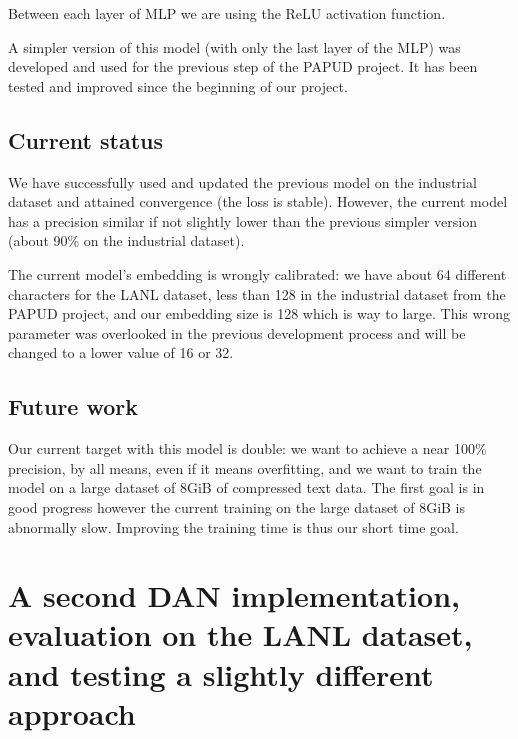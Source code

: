 Between each layer of MLP we are using the ReLU activation function.

A simpler version of this model (with only the last layer of the MLP) was developed and used for the previous step of the PAPUD project. It has been tested and improved since the beginning of our project.

\subsection{Current status}
We have successfully used and updated the previous model on the industrial dataset and attained convergence (the loss is stable). However, the current model has a precision similar if not slightly lower than the previous simpler version (about 90\%  on the industrial dataset).

The current model's embedding is wrongly calibrated: we have about 64 different characters for the LANL dataset, less than 128 in the industrial dataset from the PAPUD project, and our embedding size is 128 which is way to large. This wrong parameter was overlooked in the previous development process and will be changed to a lower value of 16 or 32.

\subsection{Future work}
Our current target with this model is double:
we want to achieve a near 100\% precision, by all means, even if it means overfitting, and we want to train the model on a large dataset of 8GiB of compressed text data. The first goal is in good progress however the current training on the large dataset of 8GiB is abnormally slow. Improving the training time is thus our short time goal.

\section{A second DAN implementation, evaluation on the LANL dataset, and testing a slightly different approach}

